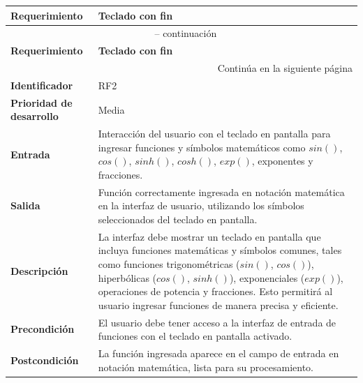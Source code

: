 \begin{longtable}{|m{3.5cm}|m{9.5cm}|}
	\hline
	\rowcolor{black!75} \color{white}\textbf{Requerimiento} & \color{white}\textbf{Teclado con fin} \\
	\hline
	\endfirsthead
	\multicolumn{2}{c}{{\tablename\ \thetable{} -- continuación}} \\
	\hline
	\rowcolor{black!75} \color{white}\textbf{Requerimiento} & \color{white}\textbf{Teclado con fin} \\
	\hline
	\endhead
	\hline \multicolumn{2}{r}{{Continúa en la siguiente página}} \\
	\endfoot
	\hline
	\endlastfoot
	
	\textbf{Identificador} & RF2 \\
	\hline
	\textbf{Prioridad de desarrollo} & Media \\
	\hline
	\textbf{Entrada} & Interacción del usuario con el teclado en pantalla para ingresar funciones y símbolos matemáticos como $sin()$, $cos()$, $sinh()$, $cosh()$, $exp()$, exponentes y fracciones. \\
	\hline
	\textbf{Salida} & Función correctamente ingresada en notación matemática en la interfaz de usuario, utilizando los símbolos seleccionados del teclado en pantalla. \\
	\hline
	\textbf{Descripción} & La interfaz debe mostrar un teclado en pantalla que incluya funciones matemáticas y símbolos comunes, tales como funciones trigonométricas ($sin()$, $cos()$), hiperbólicas ($cos()$, $sinh()$), exponenciales ($exp()$), operaciones de potencia y fracciones. Esto permitirá al usuario ingresar funciones de manera precisa y eficiente. \\
	\hline
	\textbf{Precondición} & El usuario debe tener acceso a la interfaz de entrada de funciones con el teclado en pantalla activado. \\
	\hline
	\textbf{Postcondición} & La función ingresada aparece en el campo de entrada en notación matemática, lista para su procesamiento. \\
	\hline
\end{longtable}
 \label{tabla:RF2}
\vspace{0.5cm}

